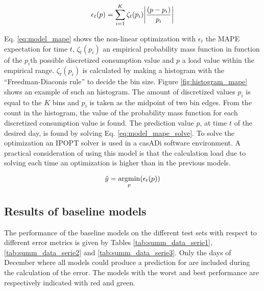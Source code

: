  \begin{equation}\label{eq:model_mape} 	
 	\epsilon_{t}(p) = \sum_{i=1}^K \zeta_{t}(p_i)\abs{\frac{(p-p_{i})}{p_{i}}}
 \end{equation}

Eq. \ref{eq:model_mape} shows the non-linear optimization with $ \epsilon_{t} $ the MAPE expectation for time $ t $, $\zeta_{t}(p_i)$ an empirical probability mass function in function of the $ p_i $th possible discretized consumption value and $ p $ a load value within the empirical range. $ \zeta_{t}(p_i) $ is calculated by making a histogram with the ``Freedman-Diaconis rule'' to decide the bin size. Figure \ref{fig:histogram_mape} shows an example of such an histogram. The amount of discretized values $ p_i $ is equal to the $ K $ bins and $ p_i $ is taken as the midpoint of two bin edges. From the count in the histogram, the value of the probability mass function for each discretized consumption value is found. The prediction value $ p $, at time $ t $ of the desired day, is found by solving Eq. \ref{eq:model_mape_solve}. To solve the optimization an IPOPT solver is used in a casADi software environment. A practical consideration of using this model is that the calculation load due to solving each time an optimization is higher than in the previous models.

\begin{equation}\label{eq:model_mape_solve} 	
	\hat{y} = \operatorname*{argmin}_{p}(\epsilon_{t}(p))
\end{equation}
 
 
\subsection{Results of baseline models}
The performance of the baseline models on the different test sets with respect to different error metrics is given by Tables \ref{tab:summ_data_serie1}, \ref{tab:summ_data_serie2} and \ref{tab:summ_data_serie3}. Only the days of December where all models could produce a prediction for are included during the calculation of the error. The models with the worst and best performance are respectively indicated with red and green.  

